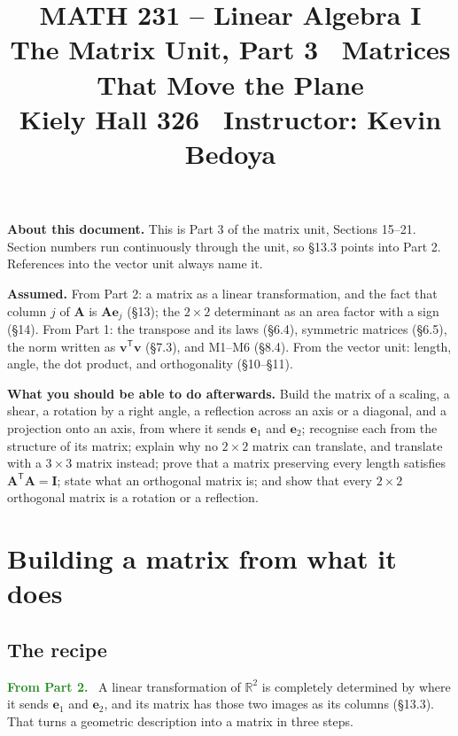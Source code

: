 \documentclass[11pt]{article}
\title{\vspace{-1.2cm}\textbf{\sffamily MATH 231 -- Linear Algebra I}\\[4pt]
       {\large\sffamily The Matrix Unit, Part 3 \textbullet\ Matrices That
        Move the Plane}\\[2pt]
       {\normalsize\sffamily Kiely Hall 326 \textbullet\
        Instructor: Kevin Bedoya}}
\author{}
\date{}
\theoremstyle{plain}
\theoremstyle{definition}
\theoremstyle{remark}
\newcommand{\lookback}[1][the vector unit]{\par\smallskip\noindent
  \textbf{\sffamily\textcolor{ForestGreen}{From #1.}}\ \ignorespaces}
\newcommand{\R}{\mathbb{R}}
\newcommand{\vc}[1]{\mathbf{#1}}
\newcommand{\mt}[1]{\mathbf{#1}}
\newcommand{\T}{^{\mathsf{T}}}
\begin{document}
\setcounter{section}{14}  %
\maketitle
\vspace{-1.6cm}

\noindent\textbf{About this document.} This is Part 3 of the matrix unit,
Sections 15--21. Section numbers run continuously through the unit, so \S13.3
points into Part 2. References into the vector unit always name it.

\medskip
\noindent\textbf{Assumed.} From Part 2: a matrix as a linear transformation,
and the fact that column $j$ of $\mt{A}$ is $\mt{A}\vc{e}_j$ (\S13); the
$2\times2$ determinant as an area factor with a sign (\S14). From Part 1: the
transpose and its laws (\S6.4), symmetric matrices (\S6.5), the norm written as
$\vc{v}\T\vc{v}$ (\S7.3), and M1--M6 (\S8.4). From the vector unit: length,
angle, the dot product, and orthogonality (\S10--\S11).

\medskip
\noindent\textbf{What you should be able to do afterwards.} Build the matrix of
a scaling, a shear, a rotation by a right angle, a reflection across an axis or
a diagonal, and a projection onto an axis, from where it sends $\vc{e}_1$ and
$\vc{e}_2$; recognise each from the structure of its matrix; explain why no
$2\times2$ matrix can translate, and translate with a $3\times3$ matrix instead;
prove that a matrix preserving every length satisfies
$\mt{A}\T\mt{A}=\mt{I}$; state what an orthogonal matrix is; and show that every
$2\times2$ orthogonal matrix is a rotation or a reflection.

\section{Building a matrix from what it does}

\subsection{The recipe}
\lookback[Part 2] A linear transformation of $\R^{2}$ is completely determined
by where it sends $\vc{e}_1$ and $\vc{e}_2$, and its matrix has those two images
as its columns (\S13.3). That turns a geometric description into a matrix in
three steps.
\end{document}
